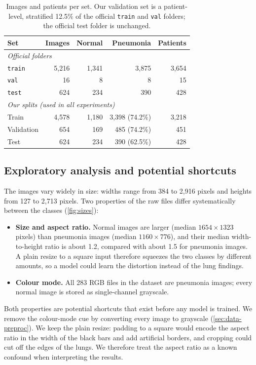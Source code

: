 \begin{table}[t]
  \centering
  \small
  \begin{tabular}{lrrrr}
    \toprule
    Set & Images & Normal & Pneumonia & Patients \\
    \midrule
    \multicolumn{5}{l}{\emph{Official folders}} \\
    \texttt{train} & 5,216 & 1,341 & 3,875 & 3,654 \\
    \texttt{val}   &    16 &     8 &     8 &    15 \\
    \texttt{test}  &   624 &   234 &   390 &   428 \\
    \midrule
    \multicolumn{5}{l}{\emph{Our splits (used in all experiments)}} \\
    Train      & 4,578 & 1,180 & 3,398 (74.2\%) & 3,218 \\
    Validation &   654 &   169 &   485 (74.2\%) &   451 \\
    Test       &   624 &   234 &   390 (62.5\%) &   428 \\
    \bottomrule
  \end{tabular}
  \caption{Images and patients per set. Our validation set is a patient-level, stratified 12.5\% of the official \texttt{train} and \texttt{val} folders; the official test folder is unchanged.}
  \label{tab:data-splits}
\end{table}

\subsection{Exploratory analysis and potential shortcuts}
\label{sec:data-eda}
The images vary widely in size: widths range from 384 to 2,916 pixels and heights from 127 to 2,713 pixels.
Two properties of the raw files differ systematically between the classes (\cref{fig:sizes}):
\begin{itemize}
  \item \textbf{Size and aspect ratio.} Normal images are larger (median $1654\times1323$ pixels) than pneumonia images (median $1160\times776$),
        and their median width-to-height ratio is about 1.2, compared with about 1.5 for pneumonia images.
        A plain resize to a square input therefore squeezes the two classes by different amounts, so a model could learn the distortion instead of the lung findings.
  \item \textbf{Colour mode.} All 283 RGB files in the dataset are pneumonia images; every normal image is stored as single-channel grayscale.
\end{itemize}
Both properties are potential shortcuts that exist before any model is trained.
We remove the colour-mode cue by converting every image to grayscale (\cref{sec:data-preproc}).
We keep the plain resize: padding to a square would encode the aspect ratio in the width of the black bars and add artificial borders,
and cropping could cut off the edges of the lungs.
We therefore treat the aspect ratio as a known confound when interpreting the results.

